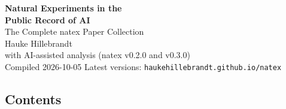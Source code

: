 \documentclass[11pt]{article}
\begin{document}
\begin{center}
{\Huge\bfseries Natural Experiments in the\\[4pt] Public Record of AI}\\[16pt]
{\Large The Complete natex Paper Collection}\\[20pt]
{\large Hauke Hillebrandt}\\[6pt]
{\normalsize with AI-assisted analysis (natex v0.2.0 and v0.3.0)}\\[20pt]
{\normalsize Compiled 2026-10-05 \quad\textbullet\quad Latest versions: \texttt{haukehillebrandt.github.io/natex}}
\end{center}
\vspace{12pt}
\subsection*{Contents}
\end{document}
